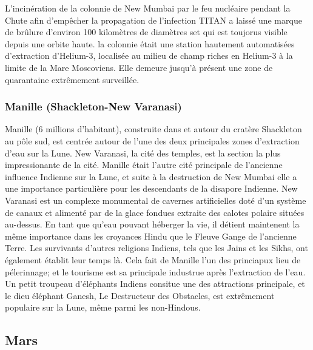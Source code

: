                                                             L'incinération de la colonnie de New Mumbai par le feu nucléaire pendant la Chute afin d'empêcher la propagation de l'infection TITAN a laissé une marque de brûlure d'environ 100 kilomètres de diamètres set qui est toujorus visible depuis une orbite haute. la colonnie était une station hautement automatisées d'extraction d'Helium-3, localisée au milieu de champ riches en Helium-3 à la limite de la Mare Moscoviens. Elle demeure jusqu'à présent une zone de quarantaine extrêmement surveillée. 

                                                            \subsubsection{Manille (Shackleton-New Varanasi)} \label{sec:shackle-shackl-new} 

                                                            Manille (6 millions d'habitant), construite dans et autour du cratère Shackleton au pôle sud, est centrée autour de l'une des deux principales zones d'extraction d'eau sur la Lune. New Varanasi, la cité des temples, est la section la plus impressionante de la cité. Manille était l'autre cité principale de l'ancienne influence Indienne sur la Lune, et suite à la destruction de New Mumbai elle a une importance particulière pour les descendants de la disapore Indienne. New Varanasi est un complexe monumental de cavernes artificielles doté d'un système de canaux et alimenté par de la glace fondues extraite des calotes polaire situées au-dessus. En tant que qu'eau pouvant héberger la vie, il détient maintenent la même importance dans les croyances Hindu que le Fleuve Gange de l'ancienne Terre. Les survivants d'autres religions Indiens, tels que les Jains et les Sikhs, ont également établit leur temps là. Cela fait de Manille l'un des princiapux lieu de pélerinnage; et le tourisme est sa principale industrue après l'extraction de l'eau. Un petit troupeau d'éléphants Indiens consitue une des attractions principale, et le dieu éléphant Ganesh, Le Destructeur des Obstacles, est extrêmement populaire sur la Lune, même parmi les non-Hindous. 

                                                            \subsection{Mars} \label{sec:mars} 

